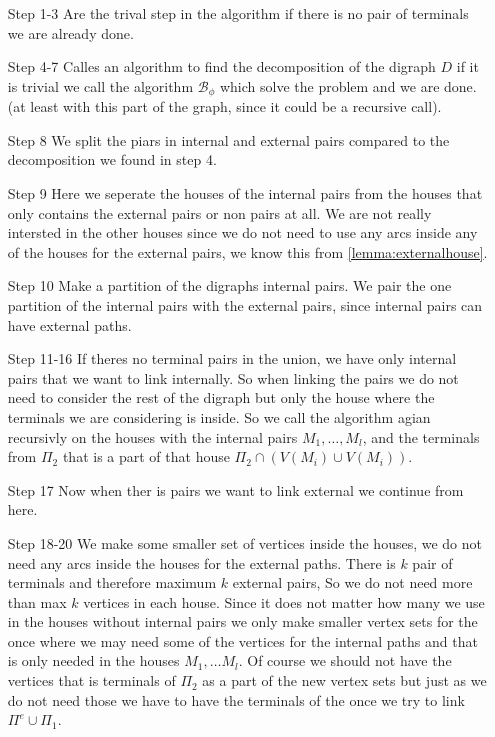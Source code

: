 \begin{itemize}
    \item[Step 1-3] Are the trival step in the algorithm if there is no pair of terminals we are already done.
    \item[Step 4-7] Calles an algorithm to find the decomposition of the digraph $D$ if it is trivial we call the algorithm $\mathcal{B}_\phi$ which solve the problem and we are done.(at least with this part of the graph, since it could be a recursive call).
    \item[Step 8] We split the piars in internal and external pairs compared to the decomposition we found in step 4.
    \item[Step 9] Here we seperate the houses of the internal pairs from the houses that only contains the external pairs or non pairs at all.
    We are not really intersted in the other houses since we do not need to use any arcs inside any of the houses for the external pairs, we know this from \autoref{lemma:externalhouse}.
    \item[Step 10] Make a partition of the digraphs internal pairs. We pair the one partition of the internal pairs with the external pairs, since internal pairs can have external paths.
    \item[Step 11-16] If theres no terminal pairs in the union, we have only internal pairs that we want to link internally. 
    So when linking the pairs we do not need to consider the rest of the digraph but only the house where the terminals we are considering is inside. 
    So we call the algorithm agian recursivly on the houses with the internal pairs $M_1,\dots , M_l$, and the terminals from $\Pi_2$ that is a part of that house $\Pi_2 \cap (V(M_i)\cup V(M_i))$. 
    \item[Step 17] Now when ther is pairs we want to link external we continue from here.
    \item[Step 18-20] We make some smaller set of vertices inside the houses, we do not need any arcs inside the houses for the external paths. 
    There is $k$ pair of terminals and therefore maximum $k$ external pairs, So we do not need more than max $k$ vertices in each house. Since it does not matter how many we use in the houses without internal pairs we only make smaller vertex sets for the once where we may need some of the vertices for the internal paths and that is only needed in the houses $M_1,\dots M_l$. Of course we should not have the vertices that is terminals of $\Pi_2$ as a part of the new vertex sets but just as we do not need those we have to have the terminals of the once we try to link $\Pi^e \cup \Pi_1$.

\end{itemize}
